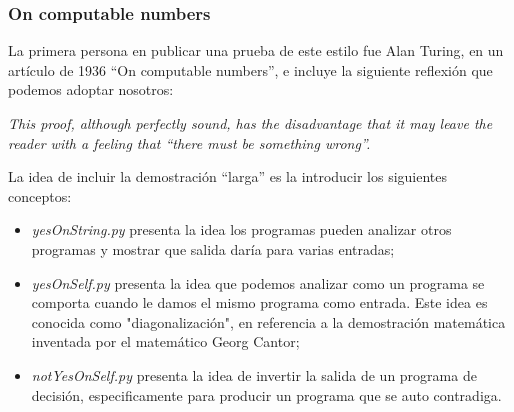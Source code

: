 \documentclass[xcolor=table]{beamer}
\begin{document}
\begin{frame} \frametitle{On computable numbers} \scriptsize  

La primera persona en publicar una prueba de este estilo fue Alan Turing, en un artículo de 1936 ``On computable numbers'', e incluye la siguiente reflexión que podemos adoptar nosotros:

\begin{center}
    \textit{This proof, although perfectly sound, has the disadvantage that it may leave the reader with a feeling that “there must be something wrong”.}
\end{center}

La idea de incluir la demostración ``larga'' es la introducir los siguientes conceptos:

\begin{itemize}
    \item \textit{yesOnString.py} presenta la idea los programas pueden analizar otros programas y mostrar que salida daría para varias entradas;
    \item \textit{yesOnSelf.py} presenta la idea que podemos analizar como un programa se comporta cuando le damos el mismo programa como entrada. Este idea es conocida como "diagonalización", en referencia a la demostración matemática inventada por el matemático Georg Cantor;
    \item \textit{notYesOnSelf.py} presenta la idea de invertir la salida de un programa de decisión, especificamente para producir un programa que se auto contradiga.
\end{itemize}


\end{frame} 

\end{document}
